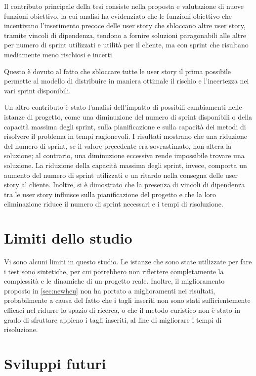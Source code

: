 \documentclass[12pt,a4paper,openright,twoside]{book}
\begin{document}
Il contributo principale della tesi consiste nella proposta e valutazione di nuove funzioni obiettivo, la cui analisi ha evidenziato che le funzioni obiettivo che incentivano l'inserimento precoce delle user story che sbloccano altre user story, tramite vincoli di dipendenza, tendono a fornire soluzioni paragonabili alle altre per numero di sprint utilizzati e utilità per il cliente, ma con sprint che risultano mediamente meno rischiosi e incerti.

Questo è dovuto al fatto che sbloccare tutte le user story il prima possibile permette al modello di distribuire in maniera ottimale il rischio e l'incertezza nei vari sprint disponibili.

Un altro contributo è stato l'analisi dell'impatto di possibili cambiamenti nelle istanze di progetto, come una diminuzione del numero di sprint disponibili o della capacità massima degli sprint, sulla pianificazione e sulla capacità dei metodi di risolvere il problema in tempi ragionevoli. I risultati mostrano che una riduzione del numero di sprint, se il valore precedente era sovrastimato, non altera la soluzione; al contrario, una diminuzione eccessiva rende impossibile trovare una soluzione. La riduzione della capacità massima degli sprint, invece, comporta un aumento del numero di sprint utilizzati e un ritardo nella consegna delle user story al cliente. Inoltre, si è dimostrato che la presenza di vincoli di dipendenza tra le user story influisce sulla pianificazione del progetto e che la loro eliminazione riduce il numero di sprint necessari e i tempi di risoluzione.

\section{Limiti dello studio}

Vi sono alcuni limiti in questo studio. Le istanze che sono state utilizzate per fare i test sono sintetiche, per cui potrebbero non riflettere completamente la complessità e le dinamiche di un progetto reale.
Inoltre, il miglioramento proposto in \ref{sec:newheu} non ha portato a miglioramenti nei risultati, probabilmente a causa del fatto che i tagli inseriti non sono stati sufficientemente efficaci nel ridurre lo spazio di ricerca, o che il metodo euristico non è stato in grado di sfruttare appieno i tagli inseriti, al fine di migliorare i tempi di risoluzione.

\section{Sviluppi futuri}
\end{document}
